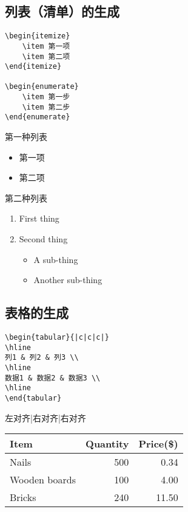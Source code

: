\documentclass[a4paper, 12pt]{article}
\begin{document}
\subsection{列表（清单）的生成}
\begin{verbatim}
\begin{itemize}
    \item 第一项
    \item 第二项
\end{itemize}

\begin{enumerate}
    \item 第一步
    \item 第二步
\end{enumerate}
  \end{verbatim}
第一种列表
\begin{itemize}
    \item 第一项
    \item 第二项
\end{itemize}

第二种列表
   \begin{enumerate}
  \item First thing
  \item Second thing
    \begin{itemize}
      \item A sub-thing
      \item Another sub-thing
    \end{itemize}
\end{enumerate}

  
\subsection{表格的生成}
\begin{verbatim}
\begin{tabular}{|c|c|c|}
\hline
列1 & 列2 & 列3 \\
\hline
数据1 & 数据2 & 数据3 \\
\hline
\end{tabular}
  \end{verbatim}

左对齐|右对齐|右对齐
  \begin{tabular}{l|r|r}
  Item   & Quantity  & Price(\$)\\
  \hline
  Nails  & 500       & 0.34\\
  Wooden boards &100 & 4.00\\
  Bricks & 240       & 11.50\\
\end{tabular}
\end{document}
